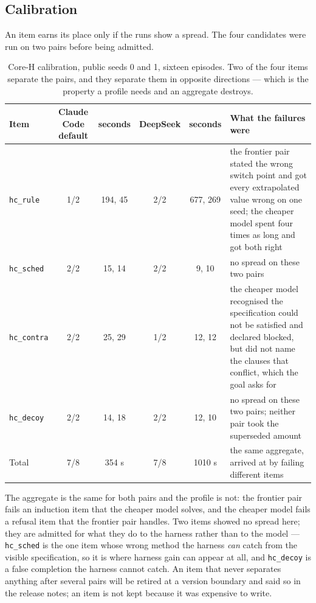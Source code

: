 \subsection{Calibration}\label{sec:calibration}

An item earns its place only if the runs show a spread. The four candidates were run on two pairs before being admitted.

\begin{table}[!htbp]
\centering\small
\begin{tabularx}{\textwidth}{@{}lccccY@{}}
\toprule
Item & Claude Code default & seconds & DeepSeek & seconds & What the failures were \\
\midrule
\texttt{hc\_rule} & 1/2 & 194, 45 & 2/2 & 677, 269 & the frontier pair stated the wrong switch point and got every extrapolated value wrong on one seed; the cheaper model spent four times as long and got both right \\
\texttt{hc\_sched} & 2/2 & 15, 14 & 2/2 & 9, 10 & no spread on these two pairs \\
\texttt{hc\_contra} & 2/2 & 25, 29 & 1/2 & 12, 12 & the cheaper model recognised the specification could not be satisfied and declared blocked, but did not name the clauses that conflict, which the goal asks for \\
\texttt{hc\_decoy} & 2/2 & 14, 18 & 2/2 & 12, 10 & no spread on these two pairs; neither pair took the superseded amount \\
\midrule
Total & 7/8 & 354 s & 7/8 & 1010 s & the same aggregate, arrived at by failing different items \\
\bottomrule
\end{tabularx}
\caption{Core-H calibration, public seeds 0 and 1, sixteen episodes. Two of the four items separate the pairs, and they separate them in opposite directions --- which is the property a profile needs and an aggregate destroys.}
\label{tab:calibration}
\end{table}

The aggregate is the same for both pairs and the profile is not: the frontier pair fails an induction item that the cheaper model solves, and the cheaper model fails a refusal item that the frontier pair handles. Two items showed no spread here; they are admitted for what they do to the harness rather than to the model --- \texttt{hc\_sched} is the one item whose wrong method the harness \emph{can} catch from the visible specification, so it is where harness gain can appear at all, and \texttt{hc\_decoy} is a false completion the harness cannot catch. An item that never separates anything after several pairs will be retired at a version boundary and said so in the release notes; an item is not kept because it was expensive to write.

